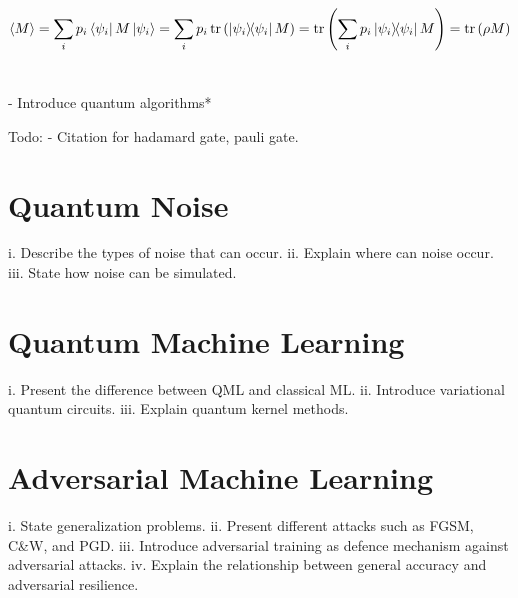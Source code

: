 \begin{equation}\label{eq:density_expectation}
  \ev{M} = \sum_{i}p_i\bra{\psi_i}M\ket{\psi_i} =
  \sum_{i}p_i\trace\left(\ketbra{\psi_i}{\psi_i}M\right) =
  \trace\left(\sum_{i}p_i\ketbra{\psi_i}{\psi_i}M\right) =
  \trace\left(\rho M\right)
\end{equation} \


- Introduce quantum algorithms* \

Todo:
- Citation for hadamard gate, pauli gate.

\section{Quantum Noise}\label{section:noise}
i.	Describe the types of noise that can occur.
ii.	Explain where can noise occur.
iii.	State how noise can be simulated.

\section{Quantum Machine Learning}
i.	Present the difference between QML and classical ML\@.
ii.	Introduce variational quantum circuits.
iii.	Explain quantum kernel methods.

\section{Adversarial Machine Learning}
i.	State generalization problems.
ii.	Present different attacks such as FGSM, C\&W, and PGD\@.
iii.	Introduce adversarial training as defence mechanism against adversarial attacks.
iv.	Explain the relationship between general accuracy and adversarial resilience.